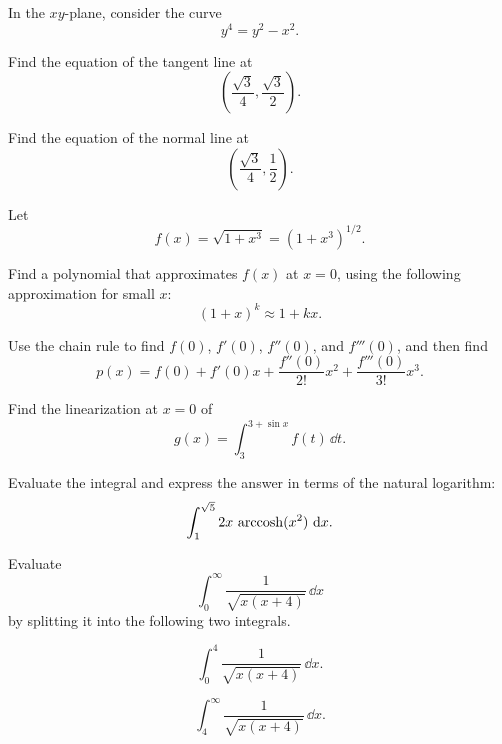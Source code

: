 \begin{problem}
In the $xy$-plane, consider the curve
\[
y^4=y^2-x^2.
\]
\begin{problemsubparts}
\item Find the equation of the tangent line at
\[
\left(\frac{\sqrt3}{4}, \frac{\sqrt3}{2}\right).
\]
\item Find the equation of the normal line at
\[
\left(\frac{\sqrt3}{4}, \frac12\right).
\]
\end{problemsubparts}
\end{problem}

\begin{problem}
Let
\[
f(x)=\sqrt{1+x^3}=(1+x^3)^{1/2}.
\]
\begin{problemsubparts}
\item Find a polynomial that approximates $f(x)$ at $x=0$, using the following approximation for small $x$:
\[
(1+x)^k\approx1+kx.
\]
\item Use the chain rule to find $f(0)$, $f'(0)$, $f''(0)$, and $f'''(0)$, and then find
\[
p(x)=f(0)+f'(0)x+\frac{f''(0)}{2!}x^2+\frac{f'''(0)}{3!}x^3.
\]
\item Find the linearization at $x=0$ of
\[
g(x)=\int_3^{3+\sin x}f(t)\,\dd t.
\]
\end{problemsubparts}
\end{problem}

\begin{problem}
Evaluate the integral and express the answer in terms of the natural logarithm:
\[
\int_1^{\sqrt5}2x\,\operatorname{arccosh}(x^2)\,\mathop{}\!\mathrm{d} x.
\]
\end{problem}

\begin{problem}
Evaluate
\[
\int_0^\infty\frac{1}{\sqrt{x(x+4)}}\,\dd x
\]
by splitting it into the following two integrals.
\begin{problemsubparts}
\item
\[
\int_0^4\frac{1}{\sqrt{x(x+4)}}\,\dd x.
\]
\item
\[
\int_4^\infty\frac{1}{\sqrt{x(x+4)}}\,\dd x.
\]
\end{problemsubparts}
\end{problem}

